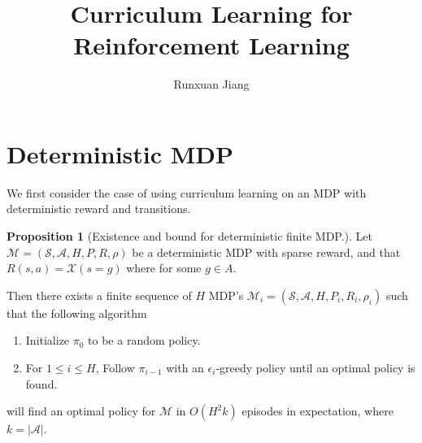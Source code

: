 \documentclass[12pt, letterpaper]{article}
\title{Curriculum Learning for Reinforcement Learning}
\author{Runxuan Jiang}
\date{}
\theoremstyle{definition}
\newtheorem*{prop}{Proposition}
\theoremstyle{remark}
\begin{document}
\maketitle

\section{Deterministic MDP}

We first consider the case of using curriculum learning on an MDP with deterministic reward and transitions.

\begin{prop}[Existence and bound for deterministic finite MDP.]
    Let \(\mathcal{M} = (\mathcal{S}, \mathcal{A}, H, P, R, \rho)\) be a deterministic MDP with sparse reward, and that \(R(s, a) = \mathcal{X}(s = g)\) where for some \(g \in A\).
    
    Then there exists a finite sequence of $H$ MDP's \(\mathcal{M}_i = (\mathcal{S}, \mathcal{A}, H, P_i, R_i, \rho_i)\) such that the following algorithm

    \begin{enumerate}
        \item Initialize \(\pi_0\) to be a random policy.
        \item For \(1 \leq i \leq H\), Follow \(\pi_{i-1}\) with an \(\epsilon_i\)-greedy policy until an optimal policy is found.
    \end{enumerate}

    will find an optimal policy for \(\mathcal{M}\) in \(O(H^2k)\) episodes in expectation, where \(k = |\mathcal{A}|\).
    
\end{prop}
\end{document}
